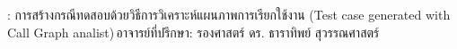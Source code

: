 \begin{abstractquote}
\studentname : การสร้างกรณีทดสอบด้วยวิธีการวิเคราะห์แผนภาพการเรียกใช้งาน (Test case generated with Call Graph analist)\,อาจารย์ที่ปรึกษา: รองศาสตร์ ดร. ธาราทิพย์ สุวรรณศาสตร์
\end{abstractquote}

\lipsum[2-3]

\lipsum[1-2]
